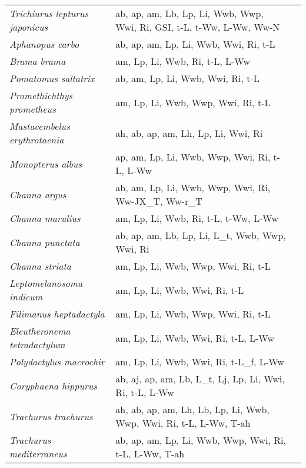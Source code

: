 {\begin{longtable}[c]{p{3.5cm}p{5.5cm}p{5.5cm}}
\emph{Trichiurus lepturus japonicus} &  ab, ap, am, Lb, Lp, Li, Wwb, Wwp, Wwi, Ri, GSI, t-L, t-Ww, L-Ww, Ww-N & \citet{WanMeng2003,LuoLu1983,ChaiZhu2015,ShiZhan2020,Li1983,KwokNi1999,WuChen1985,Hong1980} \\
\emph{Aphanopus carbo} &  ab, ap, am, Lp, Li, Wwb, Wwi, Ri, t-L & \citet{MoraSena1996} \\
\emph{Brama brama} &  am, Lp, Li, Wwb, Ri, t-L, L-Ww & \citet{Rich2003,LoboErzi2001} \\
\emph{Pomatomus saltatrix} &  ab, am, Lp, Li, Wwb, Wwi, Ri, t-L & \citet{RobiReis2009} \\
\emph{Promethichthys prometheus} &  am, Lp, Li, Wwb, Wwp, Wwi, Ri, t-L & \citet{RobiReis2009,LorePaju1995} \\
\emph{Mastacembelus erythrotaenia} &  ah, ab, ap, am, Lh, Lp, Li, Wwi, Ri &  \\
\emph{Monopterus albus} &  ap, am, Lp, Li, Wwb, Wwp, Wwi, Ri, t-L, L-Ww & \citet{YangXion2010,SusaSety2018} \\
\emph{Channa argus} &  ab, am, Lp, Li, Wwb, Wwp, Wwi, Ri, Ww-JX\_T, Ww-r\_T & \citet{ReahGala2018,LiuCui1998} \\
\emph{Channa marulius} &  am, Lp, Li, Wwb, Ri, t-L, t-Ww, L-Ww & \citet{DuaKuma2006,Kila1986} \\
\emph{Channa punctata} &  ab, ap, am, Lb, Lp, Li, L\_t, Wwb, Wwp, Wwi, Ri & \citet{SaikSing2013} \\
\emph{Channa striata} &  am, Lp, Li, Wwb, Wwp, Wwi, Ri, t-L & \citet{Kila1986} \\
\emph{Leptomelanosoma indicum} &  am, Lp, Li, Wwb, Wwi, Ri, t-L & \citet{KamLeun2002,Kadw1971} \\
\emph{Filimanus heptadactyla} &  am, Lp, Li, Wwb, Wwp, Wwi, Ri, t-L & \citet{PrasJais2005} \\
\emph{Eleutheronema tetradactylum} &  am, Lp, Li, Wwb, Wwi, Ri, t-L, L-Ww & \citet{BallWelc2012} \\
\emph{Polydactylus macrochir} &  am, Lp, Li, Wwb, Wwi, Ri, t-L\_f, L-Ww & \citet{MoorSimp2012} \\
\emph{Coryphaena hippurus} &  ab, aj, ap, am, Lb, L\_t, Lj, Lp, Li, Wwi, Ri, t-L, L-Ww & \citet{FuruOhsh2012} \\
\emph{Trachurus trachurus} &  ah, ab, ap, am, Lh, Lb, Lp, Li, Wwb, Wwp, Wwi, Ri, t-L, L-Ww, T-ah & \citet{PipeWalk1987,KingTool1977,AbauGord2003} \\
\emph{Trachurus mediterraneus} &  ab, ap, am, Lp, Li, Wwb, Wwp, Wwi, Ri, t-L, L-Ww, T-ah & \citet{Karl2000} \\

\end{longtable}}
